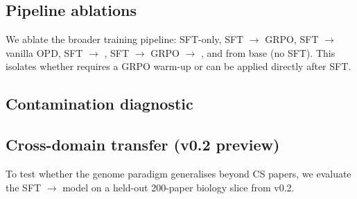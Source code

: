 \subsection{Pipeline ablations}
\label{sec:exp:pipeline}

We ablate the broader training pipeline: SFT-only, SFT $\to$ GRPO,
SFT $\to$ vanilla OPD, SFT $\to$ \evoopd{}, SFT $\to$ GRPO $\to$
\evoopd{}, and \evoopd{} from base (no SFT). This isolates whether
\evoopd{} requires a GRPO warm-up or can be applied directly after SFT.

\subsection{Contamination diagnostic}
\label{sec:exp:contamination}


\subsection{Cross-domain transfer (v0.2 preview)}
\label{sec:exp:transfer}

To test whether the genome paradigm generalises beyond CS papers, we
evaluate the SFT $\to$ \evoopd{} model on a held-out 200-paper biology
slice from \genetrace{} v0.2. 
